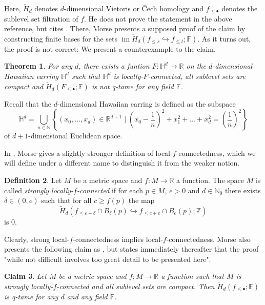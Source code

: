 \documentclass{amsart}
\theoremstyle{plain}
\newtheorem{thm}{Theorem}[section]
\newtheorem{claim}[thm]{Claim}
\theoremstyle{definition}
\newtheorem{defi}[thm]{Definition}
\DeclareMathOperator{\im}{im}
\newcommand\CH{\check{H}}
\begin{document}
Here, $\CH_{d}$ denotes $d$-dimensional Vietoris or \v{C}ech homology and $f_{\leq\bullet}$ denotes the sublevel set filtration of $f$. He does not prove the statement in the above reference, but cites \cite[Theorem 6.1]{Morse.1938}. There, Morse presents a supposed proof of the claim by constructing finite bases for the sets $\im \CH_d(f_{\leq s}\hookrightarrow f_{\leq t};\mathbb{F})$. As it turns out, the proof is not correct: We present a counterexample to the claim.

\begin{thm}\label{thm:counterexample}
For any $d$, there exists a funtion $F\colon \mathbb{H}^{d}\to\mathbb{R}$ on the $d$-dimensional Hawaiian earring $\mathbb{H}^{d}$ such that $\mathbb{H}^{d}$ is locally-$F$-connected, all sublevel sets are compact and $\CH_d(F_{\leq\bullet};\mathbb{F})$ is not q-tame for any field $\mathbb{F}$.
\end{thm}

Recall that the $d$-dimensional Hawaiian earring is defined as the subspace
\[
\mathbb{H}^{d}=\bigcup_{n\in\mathbb{N}}\left\{(x_0,\dots,x_d)\in\mathbb{R}^{d+1}\mid \left(x_0-\frac{1}{n}\right)^2+x_1^2+\dots+x_d^2=\left(\frac{1}{n}\right)^2\right\}
\]
of $d+1$-dimensional Euclidean space.

In \cite{Morse.1937}, Morse gives a slightly stronger definition of local-$f$-connectedness, which we will define under a different name to distinguish it from the weaker notion.

\begin{defi}
Let $M$ be a metric space and $f\colon M\to\mathbb{R}$ a function. The space $M$ is called \emph{strongly locally-$f$-connected} if for each $p\in M$, $e>0$ and $d\in\mathbb{N}_0$ there exists $\delta\in(0,e)$ such that for all $c\geq f(p)$ the map 
\[
\tilde{H}_d(f_{\leq c+\delta}\cap B_{\delta}(p)\hookrightarrow f_{\leq c+e}\cap B_e(p);\mathbb{Z})
\]
is 0.
\end{defi}

Clearly, strong local-$f$-connectedness implies local-$f$-connectedness. Morse also presents the following claim as \cite[Theorem 9.2]{Morse.1937}, but states immediately thereafter that the proof "while not difficult involves too great detail to be presented here".

\begin{claim}\label{con:q-tame_pers_cech_hom}
Let $M$ be a metric space and $f\colon M\to\mathbb{R}$ a function such that $M$ is strongly locally-$f$-connected and all sublevel sets are compact. Then $\CH_d(f_{\leq\bullet};\mathbb{F})$ is q-tame for any $d$ and any field $\mathbb{F}$.
\end{claim}
\end{document}
